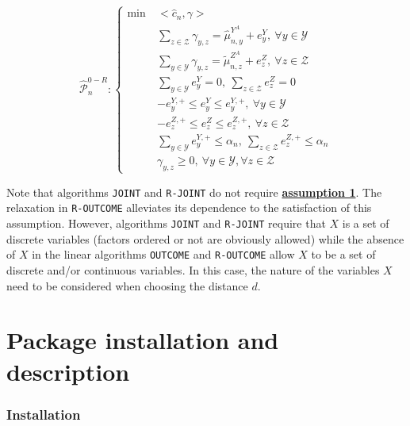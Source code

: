 \begin{equation}
\widehat{\mathcal{P}}^{0-R}_n:    \left\{
 \begin{aligned}
      \min\: & <\widehat{c}_n,\gamma>\\
         & \sum_{z\in \mathcal{Z}} \gamma_{y,z} = \hat{\mu}^{Y^A}_{n,y} + e^{Y}_{y}, \:\forall y\in \mathcal{Y}\\
         & \sum_{y\in \mathcal{Y}} \gamma_{y,z} = \tilde{\mu}^{Z^A}_{n,z} + e^{Z}_{z}, \:\forall z\in \mathcal{Z}\\
         & \sum_{y\in \mathcal{Y}} e^{Y}_{y} = 0,\: \sum_{z\in \mathcal{Z}} e^{Z}_z = 0\\
         & -e^{Y,+}_{y}\leq e^{Y}_{y} \leq e^{Y,+}_{y}, \:\forall y\in \mathcal{Y}\\
         & -e^{Z,+}_{z}\leq e^{Z}_{z} \leq e^{Z,+}_{z}, \:\forall z\in \mathcal{Z}\\
         & \sum_{y\in \mathcal{Y}} e^{Y,+}_{y} \leq \alpha_n,\: \sum_{z\in \mathcal{Z}} e^{Z,+}_{z} \leq \alpha_n\\
         & \gamma_{y,z} \geq 0,  \:\forall y\in \mathcal{Y}, \forall z\in \mathcal{Z}
 \end{aligned}\right.
\label{eq:modeloutcomerelaxed}
\end{equation}

Note that algorithms \texttt{JOINT} and \texttt{R-JOINT} do not require \protect\hyperlink{optt}{\textbf{assumption 1}}. The relaxation in \texttt{R-OUTCOME} alleviates its dependence to the satisfaction of this assumption. However, algorithms \texttt{JOINT} and \texttt{R-JOINT} require that \(X\) is a set of discrete variables (factors ordered or not are obviously allowed) while the absence of \(X\) in the linear algorithms \texttt{OUTCOME} and \texttt{R-OUTCOME} allow \(X\) to be a set of discrete and/or continuous variables. In this case, the nature of the variables \(X\) need to be considered when choosing the distance \(d\).

\hypertarget{package-installation-and-description}{%
\section{Package installation and description}\label{package-installation-and-description}}

\hypertarget{installation}{%
\subsubsection{Installation}\label{installation}}

